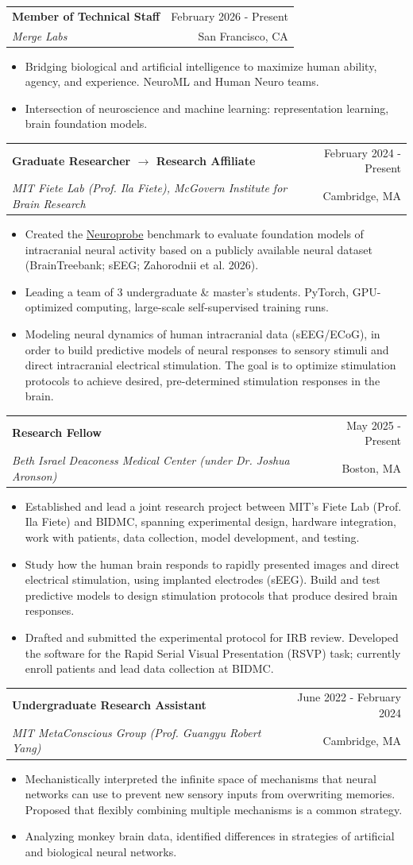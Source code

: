 \documentclass[letterpaper,11pt]{article}
\makeatletter
\newcommand{\resumeItem}[1]{
  \item\small{{#1 \vspace{-3pt}}}
}
\newcommand{\resumeSubheading}[4]{
  \vspace{-1pt}\item
  \begin{tabular*}{\textwidth}[t]{l@{\extracolsep{\fill}}r}
    \textbf{#1} & {\color{dark-grey}\small #2}\vspace{1pt}\\
    \textit{\small #3} & {\color{dark-grey}\small #4}\\
  \end{tabular*}\vspace{-6pt}
}
\newcommand{\resumeItemListStart}{\begin{itemize}}
\newcommand{\resumeItemListEnd}{\end{itemize}\vspace{0pt}}
\makeatother
\begin{document}
    \resumeSubheading
      {Member of Technical Staff}{February 2026 - Present}
      {Merge Labs}{San Francisco, CA}
      \resumeItemListStart
        \resumeItem{Bridging biological and artificial intelligence to maximize human ability, agency, and experience. NeuroML and Human Neuro teams.}
        \resumeItem{Intersection of neuroscience and machine learning: representation learning, brain foundation models.}
      \resumeItemListEnd

    \resumeSubheading
      {Graduate Researcher $\rightarrow$ Research Affiliate}{February 2024 - Present}
      {MIT Fiete Lab (Prof. Ila Fiete), McGovern Institute for Brain Research}{Cambridge, MA}
      \resumeItemListStart
        \resumeItem{Created the \href{https://neuroprobe.dev/}{Neuroprobe} benchmark to evaluate foundation models of intracranial neural activity based on a publicly available neural dataset (BrainTreebank; sEEG; Zahorodnii et al. 2026).}
        \resumeItem{Leading a team of 3 undergraduate \& master's students. PyTorch, GPU-optimized computing, large-scale self-supervised training runs.}
        \resumeItem{Modeling neural dynamics of human intracranial data (sEEG/ECoG), in order to build predictive models of neural responses to sensory stimuli and direct intracranial electrical stimulation. The goal is to optimize stimulation protocols to achieve desired, pre-determined stimulation responses in the brain.}
      \resumeItemListEnd

    \resumeSubheading
      {Research Fellow}{May 2025 - Present}
      {Beth Israel Deaconess Medical Center (under Dr. Joshua Aronson)}{Boston, MA}
      \resumeItemListStart
        \resumeItem{Established and lead a joint research project between MIT's Fiete Lab (Prof. Ila Fiete) and BIDMC, spanning experimental design, hardware integration, work with patients, data collection, model development, and testing.}
        \resumeItem{Study how the human brain responds to rapidly presented images and direct electrical stimulation, using implanted electrodes (sEEG). Build and test predictive models to design stimulation protocols that produce desired brain responses.}
        \resumeItem{Drafted and submitted the experimental protocol for IRB review. Developed the software for the Rapid Serial Visual Presentation (RSVP) task; currently enroll patients and lead data collection at BIDMC.}
      \resumeItemListEnd

    \resumeSubheading
      {Undergraduate Research Assistant}{June 2022 - February 2024}
      {MIT MetaConscious Group (Prof. Guangyu Robert Yang)}{Cambridge, MA}
      \resumeItemListStart
        \resumeItem{Mechanistically interpreted the infinite space of mechanisms that neural networks can use to prevent new sensory inputs from overwriting memories. Proposed that flexibly combining multiple mechanisms is a common strategy.}
        \resumeItem{Analyzing monkey brain data, identified differences in strategies of artificial and biological neural networks.}
      \resumeItemListEnd
\end{document}

